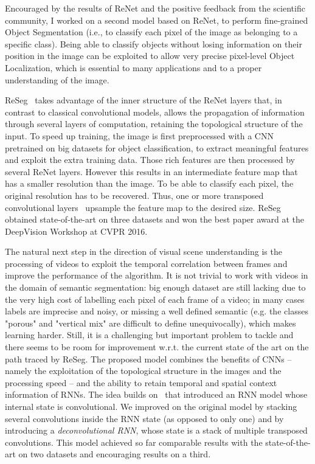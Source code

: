 Encouraged by the results of ReNet and the positive feedback from the
scientific community, I worked on a second model based on ReNet, to perform
fine-grained Object Segmentation (i.e., to classify each pixel of the image as
belonging to a specific class). Being able to classify objects without losing
information on their position in the image can be exploited to allow very
precise pixel-level Object Localization, which is essential to many
applications and to a proper understanding of the image.

ReSeg~\citep{Visin_2016_CVPR_Workshops} takes advantage of the inner structure
of the ReNet layers that, in contrast to classical convolutional models, allows
the propagation of information through several layers of computation, retaining
the topological structure of the input. To speed up training, the image is
first preprocessed with a CNN pretrained on big datasets for object
classification, to extract meaningful features and exploit the extra training
data. Those rich features are then processed by several ReNet layers. However
this results in an intermediate feature map that has a smaller resolution
than the image. To be able to classify each pixel, the original resolution has
to be recovered. Thus, one or more transposed convolutional layers~\citep{
dumoulin2016guide} upsample the feature map to the desired size. ReSeg obtained
state-of-the-art on three datasets and won the best paper award at the
DeepVision Workshop at CVPR 2016.

The natural next step in the direction of visual scene understanding is the
processing of videos to exploit the temporal correlation between frames and
improve the performance of the algorithm. It is not trivial to work with videos
in the domain of semantic segmentation: big enough dataset are still lacking
due to the very high cost of labelling each pixel of each frame of a video; in
many cases labels are imprecise and noisy, or missing a well defined semantic
(e.g. the classes "porous" and "vertical mix" are difficult to define
unequivocally), which makes learning harder. Still, it is a challenging but
important problem to tackle and there seems to be room for improvement w.r.t.
the current state of the art on the path traced by ReSeg. The proposed model
combines the benefits of CNNs -- namely the exploitation of the topological
structure in the images and the processing speed -- and the ability to retain
temporal and spatial context information of RNNs. The idea builds on~\cite{
xingjian2015convolutional} that introduced an RNN model whose internal state is
convolutional. We improved on the original model by stacking several
convolutions inside the RNN state (as opposed to only one) and by introducing a
\emph{deconvolutional RNN}, whose state is a stack of multiple transposed
convolutions. This model achieved so far comparable results with the
state-of-the-art on two datasets and encouraging results on a third.

